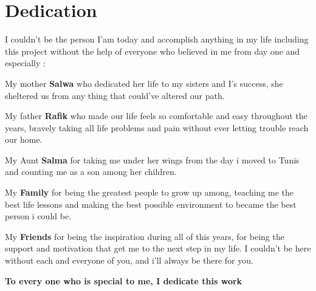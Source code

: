 \chapter*{Dedication}

I couldn't be the person I'am today and accomplish anything in my life including this project without the help of everyone who believed in me from day one and especially :\newline


My mother \textbf{Salwa}  who dedicated her life to my sisters and I's success, she sheltered us from any thing that could've altered our path.\newline

My father \textbf{Rafik}  who made our life feels so comfortable and easy throughout the years, bravely taking all life problems and pain without ever letting trouble reach our home.\newline

My Aunt \textbf{Salma} for taking me under her wings from the day i moved to Tunis and counting me as a son among her children.\newline

My \textbf{Family} for being the greatest people to grow up among, teaching me the best life lessons and making the best possible environment to became the best person i could be.\newline

My \textbf{Friends} for being the inspiration during all of this years, for being the support and motivation that get me to the next step in my life. I couldn't be here without each and everyone of you, and i'll always be there for you.\newline

\begin{center}
	\textbf{To every one who is special to me, I dedicate this work}
\end{center}
